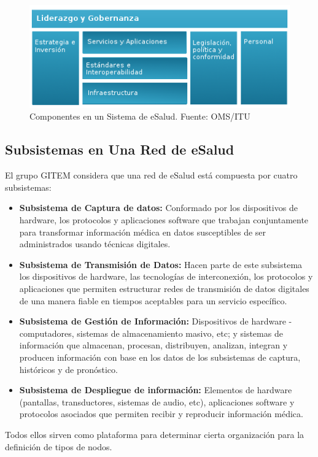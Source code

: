 \begin{figure}
 \centering
 \includegraphics{red_1.png}
 \caption{Componentes en un Sistema de eSalud. Fuente: OMS/ITU}
 \label{subcomponentes}
\end{figure}

\subsection{Subsistemas en Una Red de eSalud}

El grupo GITEM considera que una red de eSalud está compuesta por cuatro subsistemas:

\begin{itemize}
 \item \textbf{Subsistema de Captura de datos:} Conformado por los dispositivos de hardware, los protocolos y aplicaciones software que trabajan conjuntamente para transformar información médica en datos susceptibles de ser administrados usando técnicas digitales.
 \item \textbf{Subsistema de Transmisión de Datos:} Hacen parte de este subsistema los dispositivos de hardware, las tecnologías de interconexión, los protocolos y aplicaciones que permiten estructurar redes de transmisión de datos digitales de una manera fiable en tiempos aceptables para un servicio específico.
 \item \textbf{Subsistema de Gestión de Información:} Dispositivos de hardware - computadores, sistemas de almacenamiento masivo, etc; y  sistemas de información que almacenan, procesan, distribuyen, analizan, integran y producen información con base en los datos de los subsistemas de captura, históricos y de pronóstico.
 \item \textbf{Subsistema de Despliegue de información:} Elementos de hardware (pantallas, transductores, sistemas de audio, etc), aplicaciones software y protocolos asociados que permiten recibir y reproducir información médica. 
\end{itemize}

Todos ellos  sirven como plataforma para determinar cierta organización para la definición de tipos de nodos. 